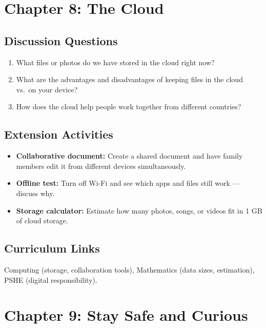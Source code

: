 \section*{Chapter 8: The Cloud}

\subsection*{Discussion Questions}
\begin{enumerate}
  \item What files or photos do we have stored in the cloud right now?
  \item What are the advantages and disadvantages of keeping files in the cloud vs.\ on your device?
  \item How does the cloud help people work together from different countries?
\end{enumerate}

\subsection*{Extension Activities}
\begin{itemize}
  \item \textbf{Collaborative document:} Create a shared document and have family members edit it from different devices simultaneously.
  \item \textbf{Offline test:} Turn off Wi-Fi and see which apps and files still work — discuss why.
  \item \textbf{Storage calculator:} Estimate how many photos, songs, or videos fit in 1 GB of cloud storage.
\end{itemize}

\subsection*{Curriculum Links}
Computing (storage, collaboration tools), Mathematics (data sizes, estimation), PSHE (digital responsibility).

\sectionrule

\section*{Chapter 9: Stay Safe and Curious}

